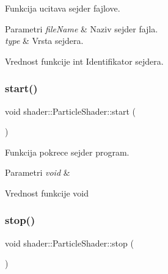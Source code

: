 Funkcija ucitava sejder fajlove. 


\begin{DoxyParams}{Parametri}
{\em file\+Name} & Naziv sejder fajla. \\
\hline
{\em type} & Vrsta sejdera. \\
\hline
\end{DoxyParams}
\begin{DoxyReturn}{Vrednost funkcije}
int Identifikator sejdera. 
\end{DoxyReturn}
\mbox{\label{classshader_1_1ParticleShader_ab1259c5e260115413e169eb1264ced12}} 
\subsubsection{\texorpdfstring{start()}{start()}}
{\footnotesize\ttfamily void shader\+::\+Particle\+Shader\+::start (\begin{DoxyParamCaption}\item[{void}]{ }\end{DoxyParamCaption})}



Funkcija pokrece sejder program. 


\begin{DoxyParams}{Parametri}
{\em void} & \\
\hline
\end{DoxyParams}
\begin{DoxyReturn}{Vrednost funkcije}
void 
\end{DoxyReturn}
\mbox{\label{classshader_1_1ParticleShader_a2695a213b94d3d9eca0b381dec26b70a}} 
\subsubsection{\texorpdfstring{stop()}{stop()}}
{\footnotesize\ttfamily void shader\+::\+Particle\+Shader\+::stop (\begin{DoxyParamCaption}\item[{void}]{ }\end{DoxyParamCaption})}



